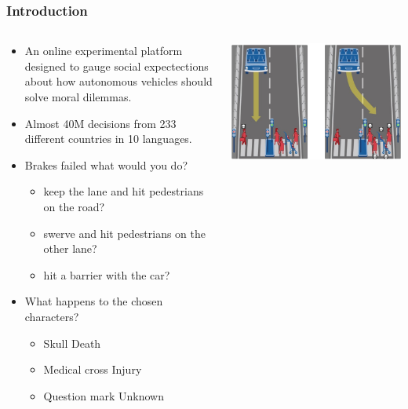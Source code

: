 \documentclass[aspectratio=169]{beamer}
\begin{document}
\begin{frame}
    \frametitle{Introduction}
    \begin{columns}[T]
        \begin{column}{0.5\linewidth}
        \begin{itemize}
            \item An online experimental platform designed to gauge social expectections about how autonomous vehicles should solve moral dilemmas.
            \item Almost 40M decisions from 233 different countries in 10 languages.
            \item Brakes failed what would you do?
            \begin{itemize}
                \item keep the lane and hit pedestrians on the road?
                \item swerve and hit pedestrians on the other lane?
                \item hit a barrier with the car?
            \end{itemize}
            \item What happens to the chosen characters?
            \begin{itemize}
                \item Skull \rightarrow Death
                \item Medical cross \rightarrow Injury
                \item Question mark \rightarrow Unknown
            \end{itemize}
        \end{itemize}
        \end{column}
        \begin{column}{0.5\linewidth}
            \includegraphics{assets/example-mme.jpg}
        \end{column}
    \end{columns}
\end{frame}
\end{document}
